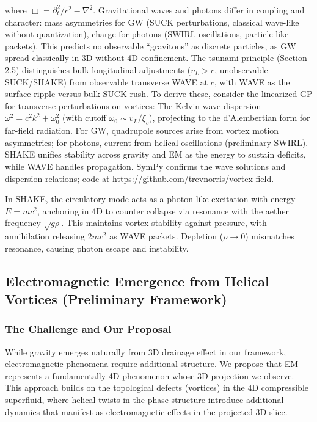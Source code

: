where $\Box = \partial_t^2 / c^2 - \nabla^2$. Gravitational waves and photons differ in coupling and character: mass asymmetries for GW (SUCK perturbations, classical wave-like without quantization), charge for photons (SWIRL oscillations, particle-like packets). This predicts no observable ``gravitons'' as discrete particles, as GW spread classically in 3D without 4D confinement. The tsunami principle (Section 2.5) distinguishes bulk longitudinal adjustments ($v_L > c$, unobservable SUCK/SHAKE) from observable transverse WAVE at $c$, with WAVE as the surface ripple versus bulk SUCK rush. To derive these, consider the linearized GP for transverse perturbations on vortices: The Kelvin wave dispersion $\omega^2 = c^2 k^2 + \omega_0^2$ (with cutoff $\omega_0 \sim v_L / \xi_c$), projecting to the d'Alembertian form for far-field radiation. For GW, quadrupole sources arise from vortex motion asymmetries; for photons, current from helical oscillations (preliminary SWIRL). SHAKE unifies stability across gravity and EM as the energy to sustain deficits, while WAVE handles propagation. SymPy confirms the wave solutions and dispersion relations; code at \url{https://github.com/trevnorris/vortex-field}.

In SHAKE, the circulatory mode acts as a photon-like excitation with energy $E = mc^2$, anchoring in 4D to counter collapse via resonance with the aether frequency $\sqrt{g \rho}$. This maintains vortex stability against pressure, with annihilation releasing $2mc^2$ as WAVE packets. Depletion ($\rho \to 0$) mismatches resonance, causing photon escape and instability.

\subsection{Electromagnetic Emergence from Helical Vortices (Preliminary Framework)}

\subsubsection{The Challenge and Our Proposal}
While gravity emerges naturally from 3D drainage effect in our framework, electromagnetic phenomena require additional structure. We propose that EM represents a fundamentally 4D phenomenon whose 3D projection we observe. This approach builds on the topological defects (vortices) in the 4D compressible superfluid, where helical twists in the phase structure introduce additional dynamics that manifest as electromagnetic effects in the projected 3D slice.

